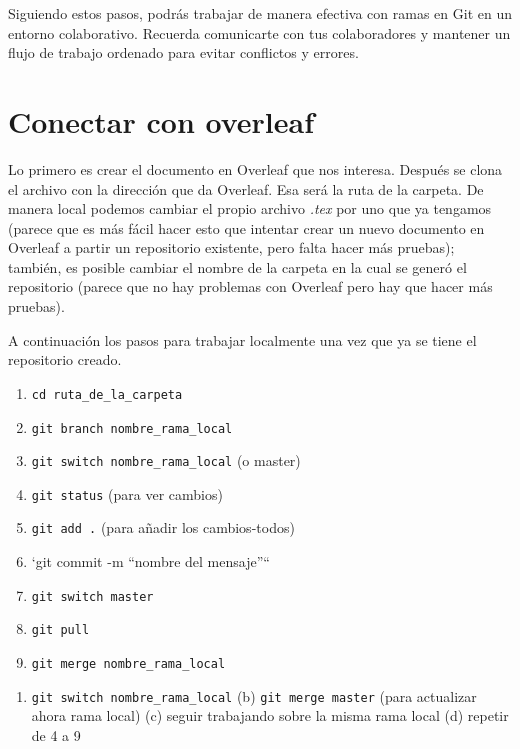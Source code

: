 \documentclass[
]{book}
\providecommand{\tightlist}{%
  \setlength{\itemsep}{0pt}\setlength{\parskip}{0pt}}
\begin{document}
Siguiendo estos pasos, podrás trabajar de manera efectiva con ramas en Git en un entorno colaborativo. Recuerda comunicarte con tus colaboradores y mantener un flujo de trabajo ordenado para evitar conflictos y errores.

\hypertarget{conectar-con-overleaf}{%
\section{Conectar con overleaf}\label{conectar-con-overleaf}}

Lo primero es crear el documento en Overleaf que nos interesa. Después se clona el archivo con la dirección que da Overleaf. Esa será la ruta de la carpeta. De manera local podemos cambiar el propio archivo \emph{.tex} por uno que ya tengamos (parece que es más fácil hacer esto que intentar crear un nuevo documento en Overleaf a partir un repositorio existente, pero falta hacer más pruebas); también, es posible cambiar el nombre de la carpeta en la cual se generó el repositorio (parece que no hay problemas con Overleaf pero hay que hacer más pruebas).

A continuación los pasos para trabajar localmente una vez que ya se tiene el repositorio creado.

\begin{enumerate}
\def\labelenumi{\arabic{enumi})}
\item
  \texttt{cd\ ruta\_de\_la\_carpeta}
\item
  \texttt{git\ branch\ nombre\_rama\_local}
\item
  \texttt{git\ switch\ nombre\_rama\_local} (o master)
\item
  \texttt{git\ status} (para ver cambios)
\item
  \texttt{git\ add\ .} (para añadir los cambios-todos)
\item
  `git commit -m ``nombre del mensaje''``
\item
  \texttt{git\ switch\ master}
\item
  \texttt{git\ pull}
\item
  \texttt{git\ merge\ nombre\_rama\_local}
\end{enumerate}

\begin{enumerate}
\def\labelenumi{(\alph{enumi})}
\tightlist
\item
  \texttt{git\ switch\ nombre\_rama\_local}
  (b) \texttt{git\ merge\ master} (para actualizar ahora rama local)
  (c) seguir trabajando sobre la misma rama local
  (d) repetir de 4 a 9
\end{enumerate}
\end{document}
